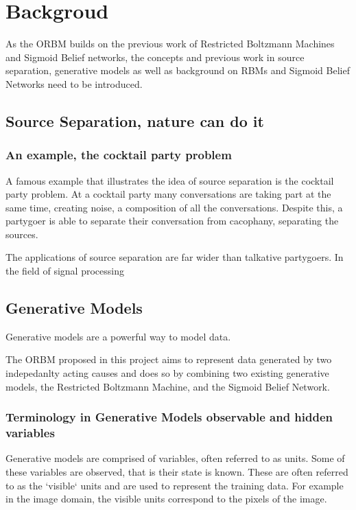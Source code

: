 \chapter{Backgroud}

 As the ORBM builds on the previous work of Restricted Boltzmann Machines and Sigmoid Belief networks, the concepts and previous work in source separation, generative models as well as background on RBMs and Sigmoid Belief Networks need to be introduced.

\section{Source Separation, nature can do it}

\subsection{An example, the cocktail party problem}
A famous example that illustrates the idea of source separation is the cocktail party problem. At a cocktail party many conversations are taking part at the same time, creating noise, a composition of all the conversations. Despite this, a partygoer is able to separate their conversation from cacophany, separating the sources.

The applications of source separation are far wider than talkative partygoers. In the field of signal processing
\todo%
\section{Generative Models}

Generative models are a powerful way to model data.

The ORBM proposed in this project aims to represent data generated by two indepedanlty acting causes and does so by combining two existing generative models, the Restricted Boltzmann Machine, and the Sigmoid Belief Network.

\subsection{Terminology in Generative Models observable and hidden variables}

Generative models are comprised of variables, often referred to as units. Some of these variables are observed, that is their state is known. These are often referred to as the `visible` units and are used to represent the training data. For example in the image domain, the visible units correspond to the pixels of the image.

